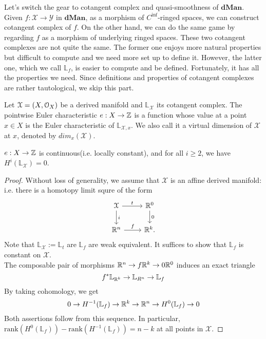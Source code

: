 Let's switch the gear to cotangent complex and quasi-smoothness of $\textbf{dMan}$. Given $f:\mathcal{X} \to \mathcal{Y}$ in $\textbf{dMan}$, as a morphism of $C^{\inf}$-ringed spaces, we can construct cotangent complex of $f$. On the other hand, we can do the same game by regarding $f$ as a morphism of underlying ringed spaces. These two cotangent complexes are not quite the same. The former one enjoys more natural properties but difficult to compute and we need more set up to define it. However, the latter one, which we call $\mathbb{L}_f$, is easier to compute and be defined. Fortunately, it has all the properties we need. Since definitions and properties of cotangent complexes are rather tautological, we skip this part.\\

\begin{defin}
    Let $\mathcal{X}=(X, \mathcal O_X)$ be a derived manifold and $\mathbb{L}_{\mathcal{X}}$ its cotangent complex. The pointwise Euler characteristic $e:X \to \mathbb Z$ is a function whose value at a point $x \in X$ is the Euler characteristic of $\mathbb{L}_{\mathcal{X}, x}$. We also call it a virtual dimension of $\mathcal{X}$ at $x$, denoted by $dim_x(\mathcal{X})$.
\end{defin}
\begin{prop}
    $e:X \to \mathbb Z$ is continuous(i.e. locally constant), and for all $i \geq 2$, we have $H^i(\mathbb{L}_{\mathcal{X}})=0$. 
\end{prop}
\begin{proof}
    Without loss of generality, we assume that $\mathcal{X}$ is an affine derived manifold: i.e. there is a homotopy limit squre of the form 
    \[
    \begin{tikzcd}
    \mathcal{X} \arrow{r}{t}\arrow{d}{i} & \R^0 \arrow{d}{0} \\
    \R^n \arrow{r}{f} & \R^k.
    \end{tikzcd}
    \]
    Note that $\mathbb{L}_{\mathcal{X}}:=\mathbb{L}_t$ are $\mathbb{L}_f$ are weak equivalent. It suffices to show that $\mathbb{L}_f$ is constant on $\mathcal{X}$. \\
    The composable pair of morphisms $\mathbb R^n \rightarrow{f} \mathbb R^k \rightarrow{0} \mathbb R^0$ induces an exact triangle
    \[ f^* \mathbb{L}_{\mathbb R^k} \to \mathbb{L}_{R^n} \to \mathbb{L}_f \]
    By taking cohomology, we get
    \[ 0 \to H^{-1}(\mathbb{L}_f) \to \mathbb R^k \to \mathbb R^n \to H^0(\mathbb{L}_f) \to 0 \]
    Both assertions follow from this sequence. In particular, $\text{rank}(H^0(\mathbb{L}_f)) - \text{rank}(H^{-1}(\mathbb{L}_f))=n-k$ at all points in $\mathcal{X}$.
    
\end{proof}

